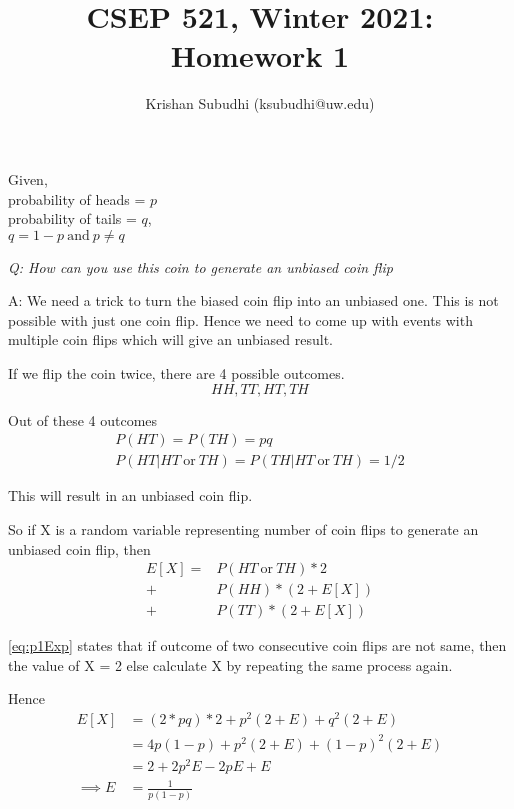 \documentclass{homeworg}
\title{CSEP 521, Winter 2021: Homework 1}
\author{Krishan Subudhi (ksubudhi@uw.edu)}
\begin{document}
\maketitle

\exercise
Given,\\
probability of heads = $p$ \\
probability of tails = $q$,\\
$q = 1 - p \ \text{and}\ p \neq q$

\emph{Q:  How can you use this coin to generate an unbiased coin flip}

A: We need a trick to turn the biased coin flip into an unbiased one. This is not possible with just one coin flip. Hence we need to come up with events with  multiple coin flips which will give an unbiased result.

If we flip the coin twice, there are 4 possible outcomes. 
\[
HH, TT, HT, TH
\]

Out of these 4 outcomes
\begin{align*}
P(HT) = P(TH) = pq\\
P(HT | HT\ \text{or}\ TH) = P(TH | HT\ \text{or}\ TH) = 1/2
\end{align*}


This will result in an unbiased coin flip. 

So if X is a random variable representing number of coin flips to generate an unbiased coin flip, then 
\begin{equation}
\label{eq:p1Exp}
\begin{split}
    E[X]  = & P(HT\ \text{or}\ TH ) \ast 2 \\
    + & P(HH) \ast (2 + E[X]) \\
    + & P(TT) \ast (2 + E[X])
\end{split}
\end{equation}

\ref{eq:p1Exp} states that if outcome of two consecutive coin flips are not same, then the value of X = 2 else calculate X by repeating the same process again.

Hence
\begin{equation}
\begin{split}
    E[X] & = (2 \ast pq) \ast 2 + p^2(2+E) + q^2(2+E) \\
    & = 4 p(1-p) + p^2(2+E) + (1-p)^2(2+E) \\
     & = 2+ 2 p^2E -2pE + E\\
    \implies E & = \frac{1}{p(1-p)}
\end{split}
\end{equation}
\end{document}
